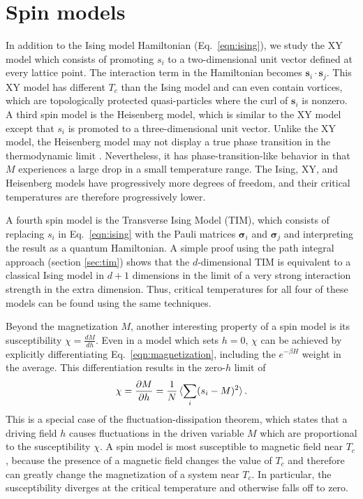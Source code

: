 \documentclass[amsmath,amssymb,aps,twocolumn,nofootinbib]{revtex4-2}
\begin{document}
\section{Spin models}
\label{sec:spin-models}

In addition to the Ising model Hamiltonian (Eq.~\ref{eqn:ising}), we study the XY model which consists of promoting $s_i$ to a two-dimensional unit vector defined at every lattice point. The interaction term in the Hamiltonian becomes $\bm s_i \cdot \bm s_j$. This XY model has different $T_c$ than the Ising model and can even contain vortices, which are topologically protected quasi-particles where the curl of $\bm s_i$ is nonzero. A third spin model is the Heisenberg model, which is similar to the XY model except that $s_i$ is promoted to a three-dimensional unit vector. Unlike the XY model, the Heisenberg model may not display a true phase transition in the thermodynamic limit \cite{tomita2014finite}. Nevertheless, it has phase-transition-like behavior in that $M$ experiences a large drop in a small temperature range. The Ising, XY, and Heisenberg models have progressively more degrees of freedom, and their critical temperatures are therefore progressively lower.

A fourth spin model is the Transverse Ising Model (TIM), which consists of replacing $s_i$ in Eq.~\ref{eqn:ising} with the Pauli matrices $\bm \sigma_i$ and $\bm \sigma_j$ and interpreting the result as a quantum Hamiltonian. A simple proof using the path integral approach (section \ref{sec:tim}) shows that the $d$-dimensional TIM is equivalent to a classical Ising model in $d+1$ dimensions in the limit of a very strong interaction strength in the extra dimension. Thus, critical temperatures for all four of these models can be found using the same techniques.

Beyond the magnetization $M$, another interesting property of a spin model is its susceptibility $\chi = \frac{dM}{dh}$. Even in a model which sets $h=0$, $\chi$ can be achieved by explicitly differentiating Eq.~\ref{eqn:magnetization}, including the $e^{-\beta H}$ weight in the average. This differentiation results in the zero-$h$ limit of
\begin{equation}
  \chi = \frac{\partial M}{\partial h} = \frac{1}{N}\braket{\sum_i(s_i - M)^2}.
\end{equation}
This is a special case of the fluctuation-dissipation theorem, which states that a driving field $h$ causes fluctuations in the driven variable $M$ which are proportional to the susceptibility $\chi$. A spin model is most susceptible to magnetic field near $T_c$, because the presence of a magnetic field changes the value of $T_c$ and therefore can greatly change the magnetization of a system near $T_c$. In particular, the susceptibility diverges at the critical temperature and otherwise falls off to zero.
\end{document}
